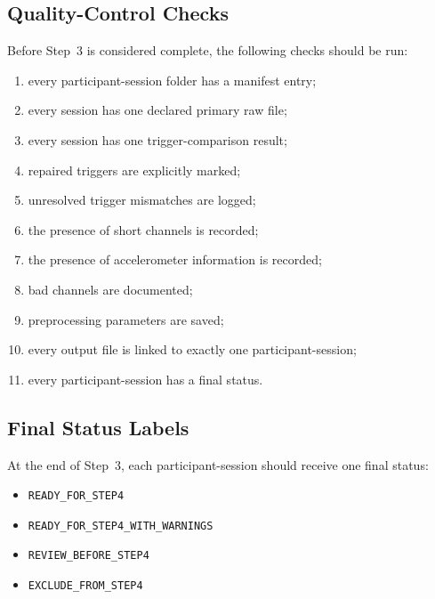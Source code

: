 \documentclass[11pt]{article}
\begin{document}
\subsection{Quality-Control Checks}
Before Step~3 is considered complete, the following checks should be run:
\begin{enumerate}
    \item every participant-session folder has a manifest entry;
    \item every session has one declared primary raw file;
    \item every session has one trigger-comparison result;
    \item repaired triggers are explicitly marked;
    \item unresolved trigger mismatches are logged;
    \item the presence of short channels is recorded;
    \item the presence of accelerometer information is recorded;
    \item bad channels are documented;
    \item preprocessing parameters are saved;
    \item every output file is linked to exactly one participant-session;
    \item every participant-session has a final status.
\end{enumerate}

\subsection{Final Status Labels}
At the end of Step~3, each participant-session should receive one final status:
\begin{itemize}
    \item \texttt{READY\_FOR\_STEP4}
    \item \texttt{READY\_FOR\_STEP4\_WITH\_WARNINGS}
    \item \texttt{REVIEW\_BEFORE\_STEP4}
    \item \texttt{EXCLUDE\_FROM\_STEP4}
\end{itemize}
\end{document}
